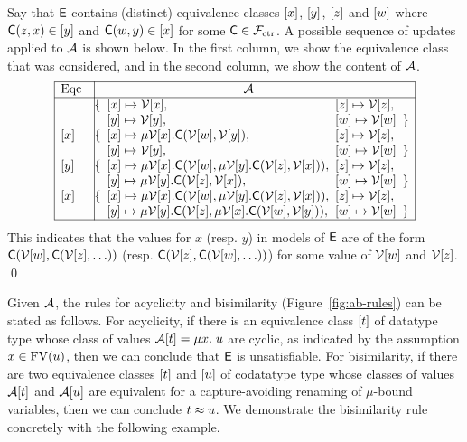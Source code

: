 \begin{example}
Say that $\mathsf{E}$ contains (distinct) equivalence classes $[ x ]$, $[ y ]$, $[ z ]$ and $[ w ]$ 
where $\textsf{C}(z,x) \in [ y ]$ and $\textsf{C}(w,y) \in [ x ]$ for some $\textsf{C} \in \mathcal{F}_{\mathrm{ctr}}$.
A possible sequence of updates applied to $\mathcal{A}$ is shown below.
In the first column, we show the equivalence class that was considered,
and in the second column, we show the content of $\mathcal{A}$.
\[\begin{array}{|l|@{\hspace{.5em}}l@{\hspace{.5em}}l@{\hspace{.5em}}l@{\hspace{.5em}}l|}
\hline
\text{Eqc} & \multicolumn{3}{c}{\Val} & \ 
\\
\hline
& \{ & \ec{x} \mapsto \Var{\ec{x}}, & \ec{z} \mapsto \Var{\ec{z}}, & \\
&    & \ec{y} \mapsto \Var{\ec{y}}, & \ec{w} \mapsto \Var{\ec{w}} & \} \\
\ec{x}
& \{ & \ec{x} \mapsto \mu \Var{\ec{x}}. \const{C}( \Var{\ec{w}}, \Var{\ec{y}} ), & \ec{z} \mapsto \Var{\ec{z}}, & \\
&    & \ec{y} \mapsto \Var{\ec{y}}, & \ec{w} \mapsto \Var{\ec{w}} & \} \\
\ec{y}
& \{ & \ec{x} \mapsto \mu \Var{\ec{x}}. \const{C}( \Var{\ec{w}}, \mu \Var{\ec{y}}. \const{C}( \Var{\ec{z}}, \Var{\ec{x}} ) ), & \ec{z} \mapsto \Var{\ec{z}}, & \\
&    & \ec{y} \mapsto \mu \Var{\ec{y}}. \const{C}( \Var{\ec{z}}, \Var{\ec{x}} ), & \ec{w} \mapsto \Var{\ec{w}} & \} \\
\ec{x}
& \{ & \ec{x} \mapsto \mu \Var{\ec{x}}. \const{C}( \Var{\ec{w}}, \mu \Var{\ec{y}}. \const{C}( \Var{\ec{z}}, \Var{\ec{x}} ) ), & \ec{z} \mapsto \Var{\ec{z}}, & \\
&    & \ec{y} \mapsto \mu \Var{\ec{y}}. \const{C}( \Var{\ec{z}}, \mu \Var{\ec{x}}. \const{C}( \Var{\ec{w}}, \Var{\ec{y}} ) ), & \ec{w} \mapsto \Var{\ec{w}} & \} \\
\hline
\end{array}\]
This indicates that the values for $x$ (resp. $y$) in models of $\mathsf{E}$
are of the form $\textsf{C}( \mathcal{V}{[ w ]}, \textsf{C}( \mathcal{V}{[ z ]}, \ldots ))$ (resp. $\textsf{C}( \mathcal{V}{[ z ]}, \textsf{C}( \mathcal{V}{[ w ]}, \ldots ))$) 
for some value of $\mathcal{V}{[ w ]}$ and $\mathcal{V}{[ z ]}$.
\qed
\end{example}

Given $\mathcal{A}$, the rules for acyclicity and bisimilarity (Figure~\ref{fig:ab-rules}) can be stated as follows.
For acyclicity, if there is an equivalence class $[ t ]$ of datatype type whose class of values $\mathcal{A} [ t ] = \mu x.\; u$ are cyclic,
as indicated by the assumption $x \in \mathrm{FV}( u )$,
then we can conclude that $\mathsf{E}$ is unsatisfiable.
For bisimilarity, if there are two equivalence classes $[ t ]$ and $[ u ]$ 
of codatatype type whose classes of values $\mathcal{A} [ t ]$ and $\mathcal{A} [ u ]$ are equivalent for a capture-avoiding renaming of $\mu$-bound variables,
then we can conclude $t \approx u$.
We demonstrate the bisimilarity rule concretely with the following example.

